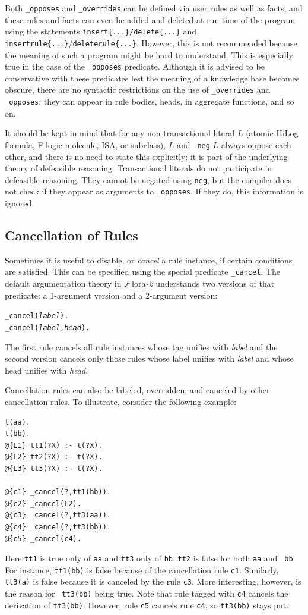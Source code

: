 \documentclass[11pt]{article}
\newcommand{\FLORA}{{\mbox{\sc ${\cal F}${lora}\rm\emph{-2}}}\xspace}
\begin{document}
Both {\tt \_opposes} and {\tt \_overrides} can be defined via user rules
as well as facts, and these rules and facts can even be added and deleted
at run-time of the program using the statements {\tt insert\{...\}/delete\{...\}} and {\tt
  insertrule\{...\}}/{\tt deleterule\{...\}}.
However, this is not recommended because the meaning of such a
program might be hard to understand. This is especially true in the case of
the {\tt \_opposes} predicate.  Although it is advised
to be conservative with these predicates lest the meaning of a knowledge
base becomes obscure, there are no syntactic restrictions on the use of
{\tt \_overrides} and {\tt \_opposes}: they can appear in rule bodies,
heads, in aggregate functions, and so on.  

It should be kept in mind that for any non-transactional literal $L$
(atomic HiLog formula, F-logic molecule, ISA, or subclass), $L$ and {\tt
  neg} $L$ always oppose each other, and there is no need to state this
explicitly: it is part of the underlying theory of defeasible reasoning.
Transactional literals do not participate in defeasible reasoning.
They cannot be negated using {\tt neg}, but the compiler does not check if
they appear as arguments to {\tt \_opposes}. If they do, this information
is ignored.

\subsection{Cancellation of Rules}\label{sec-cancel}

Sometimes it is useful to disable, or \emph{cancel} a rule instance, if
certain conditions are satisfied. This can be specified using the special
predicate {\tt \_cancel}. The default argumentation theory in \FLORA  
understands two versions of that predicate: a 1-argument version and a
2-argument version:
\begin{alltt}
    _cancel(\emph{label}).
    _cancel(\emph{label},\emph{head}).
\end{alltt}
The first rule cancels all rule instances whose tag unifies with
\emph{label} and the second version cancels only those rules whose label
unifies with \emph{label} and whose head unifies with \emph{head}.   

Cancellation rules can also be labeled, overridden,
and canceled by other cancellation
rules. To illustrate,  consider the following example:
\begin{verbatim}
t(aa).
t(bb).
@{L1} tt1(?X) :- t(?X).
@{L2} tt2(?X) :- t(?X).
@{L3} tt3(?X) :- t(?X).

@{c1} _cancel(?,tt1(bb)).
@{c2} _cancel(L2).
@{c3} _cancel(?,tt3(aa)).
@{c4} _cancel(?,tt3(bb)).
@{c5} _cancel(c4).
\end{verbatim}
Here {\tt tt1} is true only of {\tt aa} and  
{\tt tt3} only of {\tt bb}. {\tt tt2} is false for both {\tt aa} and {\tt
  bb}. For instance, {\tt tt1(bb)} is false because of the cancellation
rule {\tt c1}. Similarly, {\tt tt3(a)} is false because it is canceled by
the rule {\tt c3}.   More interesting, however, is the reason for {\tt
  tt3(bb)} being true. Note that rule tagged with {\tt c4} cancels the
derivation of {\tt tt3(bb)}. However, rule {\tt c5} cancels rule {\tt c4},
so {\tt tt3(bb)} stays put.
\end{document}
